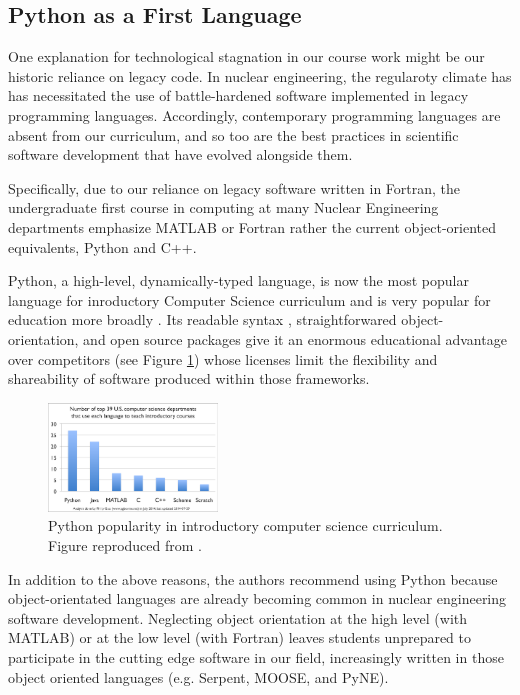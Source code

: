 \documentclass{anstrans}
\begin{document}
\subsection{Python as a First Language}

One explanation for technological stagnation in our course work might be our
historic reliance on legacy code. In nuclear engineering, the regularoty climate
has has necessitated the use of battle-hardened software implemented in legacy
programming languages. Accordingly, contemporary programming languages are
absent from our curriculum, and so too are the best practices in scientific
software development \cite{wilson_best_2014} that have evolved alongside them.

Specifically, due to our reliance on legacy software written in Fortran, the
undergraduate first course in computing at many Nuclear Engineering departments
emphasize MATLAB or Fortran rather the current object-oriented equivalents,
Python and C++.

Python, a high-level, dynamically-typed language, is now the most popular
language for inroductory Computer Science curriculum \cite{guo_python_2014} and
is very popular for education more broadly
\cite{myers_python_2014,stajano_raising_2000,backer_computational_2007}. Its
readable syntax \cite{stefik_empirical_2013}, straightforwared
object-orientation, and open source packages give it an enormous educational
advantage over competitors (see Figure \ref{fig:guo}) whose licenses limit the
flexibility and shareability of software produced within those frameworks.

\begin{figure}[htbp!]
\begin{center}
\includegraphics[width=0.4\textwidth]{guo.eps}
\end{center}
\caption{Python popularity in introductory computer science curriculum. Figure
reproduced from \cite{guo_python_2014}. }
\label{fig:guo}
\end{figure}


In addition to the above reasons, the authors recommend using Python
because object-orientated languages are already becoming common in nuclear
engineering software development.  Neglecting object orientation at the high
level (with MATLAB) or at the low level (with Fortran) leaves students
unprepared to participate in the cutting edge software in our field,
increasingly written in those object oriented languages (e.g.
Serpent\cite{lepanen_serpent_2011}, MOOSE\cite{gaston_moose_2014}, and
PyNE\cite{scopatz_pyne_2013}).
\end{document}
